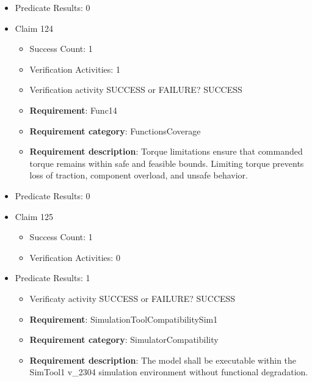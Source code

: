 \documentclass{article}
\begin{document}
\begin{itemize}
\begin{itemize}
						\item \textbf{Requirement}: Func13 
						\item \textbf{Requirement category}: FunctionsCoverage 
						\item \textbf{Requirement description}: Shift requests are checked for plausibility and translated into actionable commands. Correct gear selection is essential for drivability and safety.
					
				\end{itemize}
				
									    
				\item Predicate Results: 0

  				  \item Claim 124
				\begin{itemize}
			    	\item Success Count: 1 
			    	\item Verification Activities: 1
					\item Verification activity SUCCESS or FAILURE? SUCCESS
		
						\item \textbf{Requirement}: Func14 
						\item \textbf{Requirement category}: FunctionsCoverage 
						\item \textbf{Requirement description}: Torque limitations ensure that commanded torque remains within safe and feasible bounds. Limiting torque prevents loss of traction, component overload, and unsafe behavior.
					
				\end{itemize}
				
									    
				\item Predicate Results: 0

  				  \item Claim 125
				\begin{itemize}
			    	\item Success Count: 1 
			    	\item Verification Activities: 0
				\end{itemize}
				
									    
				\item Predicate Results: 1
					\begin{itemize}				
					\item Verificaty activity SUCCESS or FAILURE? SUCCESS
					
					\item \textbf{Requirement}: SimulationToolCompatibilitySim1 
					\item \textbf{Requirement category}: SimulatorCompatibility
					\item \textbf{Requirement description}: The model shall be executable within the SimTool1 v_2304 simulation environment without functional degradation.
					\end{itemize}


\end{itemize}
\end{document}
